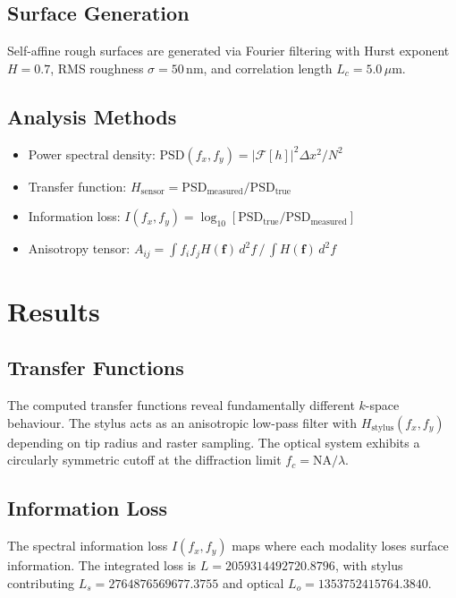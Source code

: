 \documentclass[review]{elsarticle}
\begin{document}
\subsection{Surface Generation}
Self-affine rough surfaces are generated via Fourier filtering with
Hurst exponent $H = 0.7$, RMS roughness
$\sigma = 50\,\mathrm{nm}$, and
correlation length $L_c = 5.0\,\mu\mathrm{m}$.

\subsection{Analysis Methods}
\begin{itemize}
    \item Power spectral density: $\mathrm{PSD}(f_x,f_y) = |\mathcal{F}[h]|^2 \Delta x^2 / N^2$
    \item Transfer function: $H_\mathrm{sensor} = \mathrm{PSD}_\mathrm{measured} / \mathrm{PSD}_\mathrm{true}$
    \item Information loss: $I(f_x,f_y) = \log_{10}[\mathrm{PSD}_\mathrm{true} / \mathrm{PSD}_\mathrm{measured}]$
    \item Anisotropy tensor: $A_{ij} = \int f_i f_j H(\mathbf{f}) \,d^2f \,/\, \int H(\mathbf{f}) \,d^2f$
\end{itemize}


\section{Results}
\label{sec:results}

\subsection{Transfer Functions}

The computed transfer functions reveal fundamentally different $k$-space
behaviour. The stylus acts as an anisotropic low-pass filter with
$H_\mathrm{stylus}(f_x,f_y)$ depending on tip radius and raster sampling.
The optical system exhibits a circularly symmetric cutoff at the diffraction
limit $f_c = \mathrm{NA}/\lambda$.

\subsection{Information Loss}

The spectral information loss $I(f_x,f_y)$ maps where each modality loses
surface information. The integrated loss is $L = 2059314492720.8796$,
with stylus contributing $L_s = 2764876569677.3755$ and
optical $L_o = 1353752415764.3840$.
\end{document}
